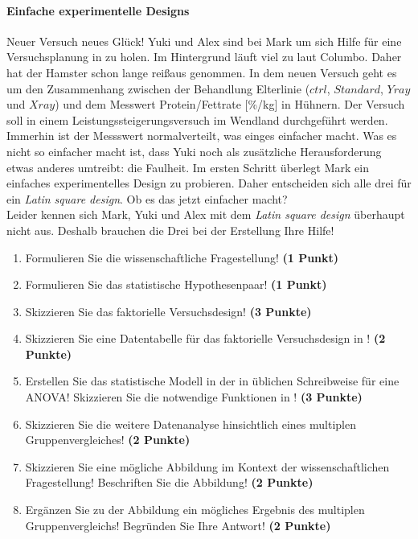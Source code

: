 \documentclass[a4paper, 9pt]{scrartcl}\usepackage[]{graphicx}\usepackage[]{xcolor}
\begin{document}
\paragraph{Einfache experimentelle Designs}

Neuer Versuch neues Glück! Yuki und Alex sind bei Mark um sich Hilfe für eine Versuchsplanung in \Rlogo zu holen. Im Hintergrund läuft viel zu laut Columbo. Daher hat der Hamster schon lange reißaus genommen. In dem neuen Versuch geht es um den Zusammenhang zwischen der Behandlung Elterlinie ($ctrl$, $Standard$, $Yray$ und $Xray$) und dem Messwert Protein/Fettrate [\%/kg] in Hühnern. Der Versuch soll in einem Leistungssteigerungsversuch im Wendland durchgeführt werden. Immerhin ist der Messswert normalverteilt, was einges einfacher macht. Was es nicht so einfacher macht ist, dass Yuki noch als zusätzliche Herausforderung etwas anderes umtreibt: die Faulheit. Im ersten Schritt überlegt Mark ein einfaches experimentelles Design zu probieren. Daher entscheiden sich alle drei für ein \textit{Latin square design}. Ob es das jetzt einfacher macht?\\

Leider kennen sich Mark, Yuki und Alex mit dem \textit{Latin square design} überhaupt nicht aus. Deshalb brauchen die Drei bei der Erstellung Ihre Hilfe!

\begin{enumerate}
  \setcounter{enumi}{0}
  \item Formulieren Sie die wissenschaftliche Fragestellung! \textbf{(1 Punkt)}
  \item Formulieren Sie das statistische Hypothesenpaar! \textbf{(1 Punkt)}
  \item Skizzieren Sie das faktorielle Versuchsdesign! \textbf{(3 Punkte)}
  \item Skizzieren Sie eine Datentabelle für das faktorielle Versuchsdesign in \Rlogo! \textbf{(2 Punkte)}
  \item Erstellen Sie das statistische Modell in der in \Rlogo üblichen Schreibweise für eine ANOVA! Skizzieren Sie die notwendige Funktionen in \Rlogo! \textbf{(3 Punkte)}
  \item Skizzieren Sie die weitere Datenanalyse hinsichtlich eines multiplen Gruppenvergleiches! \textbf{(2 Punkte)}
  \item Skizzieren Sie eine mögliche Abbildung im Kontext der wissenschaftlichen Fragestellung! Beschriften Sie die Abbildung! \textbf{(2 Punkte)}
  \item Ergänzen Sie zu der Abbildung ein mögliches Ergebnis des multiplen Gruppenvergleichs! Begründen Sie Ihre Antwort! \textbf{(2 Punkte)}
\end{enumerate}
\end{document}
